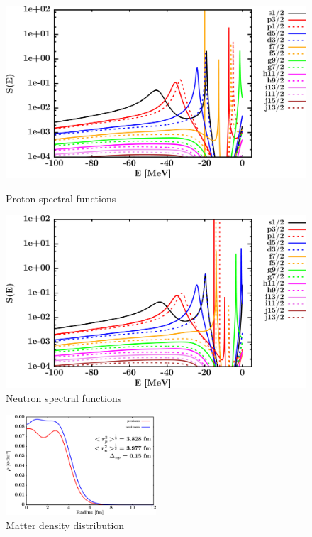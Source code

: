 \begin{figure}[H]
    \centering
    \begin{minipage}{0.45\textwidth}
        \centering
        \includegraphics[width=1.0\textwidth]{figures/ni64_protonSpectralFunctions.png}
        \caption{Proton spectral functions}
        \label{DOMFitData_ni64_proton_spectralFunctions}
    \end{minipage}\hfill
    \begin{minipage}{0.45\textwidth}
        \centering
        \includegraphics[width=1.0\textwidth]{figures/ni64_neutronSpectralFunctions.png}
        \caption{Neutron spectral functions}
        \label{DOMFitData_ni64_neutron_spectralFunctions}
    \end{minipage}
\end{figure}

\begin{figure}[H]
    \centering
    \includegraphics[width = 0.5\textwidth]{figures/ni64_matterDensity.png}
    \caption{Matter density distribution}
    \label{DOMFitData_ni64_matterDensity}
\end{figure}

